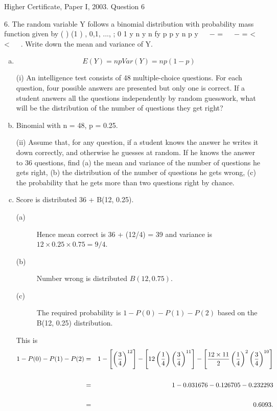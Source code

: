 \documentclass[a4paper,12pt]{article}
\begin{document}
Higher Certificate, Paper I, 2003. Question 6
\begin{framed}
6. The random variable Y follows a binomial distribution with probability mass function
given by
( ) (1 ) , 0,1, ..., ; 0 1 y n y n
fy p p y n p
y
  −
=   − = < <
 
.
Write down the mean and variance of Y.
\end{framed}

\begin{enumerate}[(a)]
\item 
\[E(Y) = np Var(Y) = np(1 - p)\]

\begin{framed}
(i) An intelligence test consists of 48 multiple-choice questions. For each
question, four possible answers are presented but only one is correct. If a
student answers all the questions independently by random guesswork, what
will be the distribution of the number of questions they get right?
\end{framed}




\item Binomial with n = 48, p = 0.25.



\newpage
\begin{framed}
(ii) Assume that, for any question, if a student knows the answer he writes it down
correctly, and otherwise he guesses at random. If he knows the answer to 36
questions, find
(a) the mean and variance of the number of questions he gets right,
(b) the distribution of the number of questions he gets wrong,
(c) the probability that he gets more than two questions right by chance.
\end{framed}


\item Score is distributed 36 + B(12, 0.25).

\begin{description}
\item[(a)] Hence mean correct is 36 + (12/4) = 39 and variance is $12 \times 0.25 \times 0.75 = 9/4$.
\item[(b)] Number wrong is distributed $B(12, 0.75)$.
\item[(c)] The required probability is $1 - P(0) - P(1) - P(2)$ based on the B(12, 0.25)
distribution. 
\end{description}

This is
\begin{eqnarray*}
1 - P(0) - P(1) - P(2) &=& 1- \left[\left(\frac{3}{4}\right)^{12}\right] - \left[12\left(\frac{1}{4}\right) \left(\frac{3}{4}\right)^{11} \right] - \left[\frac{12 \times 11}{2} \left(\frac{1}{4}\right)^{2} \left(\frac{3}{4}\right)^{10}\right]\\ \\ \bigskip
&=& 1- 0.031676 - 0.126705 - 0.232293 \\ \\ \smallskip
&=& 0.6093 .
\end{eqnarray*}


\end{enumerate}
\end{document}
